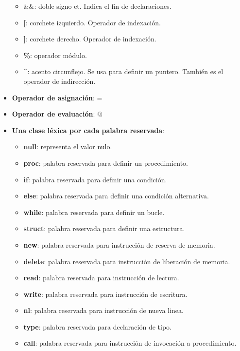\documentclass[11pt]{article}
\begin{document}
\begin{itemize}
\begin{itemize}
                \item \textbf{$\&\&$}: doble signo et. Indica el fin de declaraciones.
                \item \textbf{[}: corchete izquierdo. Operador de indexación.
                \item \textbf{]}: corchete derecho. Operador de indexación.
                \item \textbf{\%}: operador módulo.
                \item \textbf{\^{}}: acento circunflejo. Se usa para definir un puntero. También es el operador de indirección.
            \end{itemize}
            \item \textbf{Operador de asignación}: =
            \item \textbf{Operador de evaluación}: @
            \item \textbf{Una clase léxica por cada palabra reservada}:
                \begin{itemize}
                    \item \textbf{null}: representa el valor nulo.
                    \item \textbf{proc}: palabra reservada para definir un procedimiento.
                    \item \textbf{if}: palabra reservada para definir una condición.
                    \item \textbf{else}: palabra reservada para definir una condición alternativa.
                    \item \textbf{while}: palabra reservada para definir un bucle.
                    \item \textbf{struct}: palabra reservada para definir una estructura.
                    \item \textbf{new}: palabra reservada para instrucción de reserva de memoria.
                    \item \textbf{delete}: palabra reservada para instrucción de liberación de memoria.
                    \item \textbf{read}: palabra reservada para instrucción de lectura.
                    \item \textbf{write}: palabra reservada para instrucción de escritura.
                    \item \textbf{nl}: palabra reservada para instrucción de nueva linea.
                    \item \textbf{type}: palabra reservada para declaración de tipo.
                    \item \textbf{call}: palabra reservada para instrucción de invocación a procedimiento.
                \end{itemize}
        \end{itemize}
\end{document}
